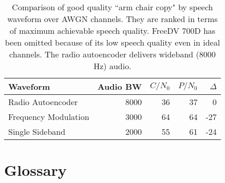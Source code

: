 \documentclass{article}
\begin{document}
\begin{table} [H]
\centering
\begin{tabular}{l r r r r}
 \hline
 Waveform             & Audio BW & $C/N_0$ & $P/N_0$ & $\Delta$ \\
 \hline
 Radio Autoencoder    & 8000 & 36 & 37 &   0 \\
 Frequency Modulation & 3000 & 64 & 64 & -27 \\
 Single Sideband      & 2000 & 55 & 61 & -24 \\
 \hline
\end{tabular}
\caption{Comparison of good quality ``arm chair copy" by speech waveform over AWGN channels. They are ranked in terms of maximum achievable speech quality. FreeDV 700D has been omitted because of its low speech quality even in ideal channels. The radio autoencoder delivers wideband (8000 Hz) audio.}
\label{tab:waveforms_good}
\end{table}

\section{Glossary}
\end{document}
